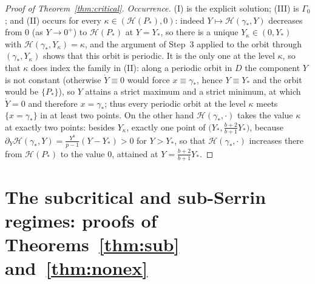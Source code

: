 \documentclass[11pt,reqno]{amsart}
\numberwithin{equation}{section}
\theoremstyle{plain}
\theoremstyle{definition}
\newcommand{\gs}{\gamma_{*}}
\begin{document}
\begin{proof}[Proof of Theorem~\ref{thm:critical}]
\smallskip
\noindent\emph{Occurrence.} {\rm(I)} is the explicit solution; {\rm(III)} is
$\Gamma_{0}$; and {\rm(II)} occurs for every
$\kappa\in(\mathcal H(P_{*}),0)$: indeed $Y\mapsto\mathcal H(\gs,Y)$ decreases
from $0$ (as $Y\to0^{+}$) to $\mathcal H(P_{*})$ at $Y=Y_{*}$, so there is a
unique $Y_{\kappa}\in(0,Y_{*})$ with $\mathcal H(\gs,Y_{\kappa})=\kappa$, and
the argument of Step~3 applied to the orbit through $(\gs,Y_{\kappa})$ shows
that this orbit is periodic. It is the only one at the level $\kappa$, so that
$\kappa$ does index the family in {\rm(II)}: along a periodic orbit in $D$ the
component $Y$ is not constant (otherwise $\dot Y\equiv0$ would force
$x\equiv\gs$, hence $Y\equiv Y_{*}$ and the orbit would be $\{P_{*}\}$), so
$Y$ attains a strict maximum and a strict minimum, at which $\dot Y=0$ and
therefore $x=\gs$; thus every periodic orbit at the level $\kappa$ meets
$\{x=\gs\}$ in at least two points. On the other hand
$\mathcal H(\gs,\cdot)$ takes the value $\kappa$ at exactly two points: besides
$Y_{\kappa}$, exactly one point of $\big(Y_{*},\tfrac{b+2}{b+1}Y_{*}\big)$,
because $\partial_{Y}\mathcal H(\gs,Y)=\frac{Y^{b}}{p-1}(Y-Y_{*})>0$ for
$Y>Y_{*}$, so that $\mathcal H(\gs,\cdot)$ increases there from
$\mathcal H(P_{*})$ to the value $0$, attained at
$Y=\frac{b+2}{b+1}Y_{*}$.
\end{proof}

\section{The subcritical and sub-Serrin regimes: proofs of
Theorems~\ref{thm:sub} and~\ref{thm:nonex}}\label{sec:sub}
\end{document}
